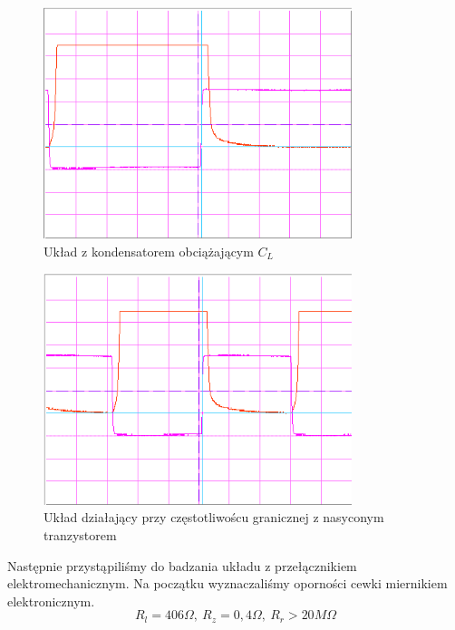 \documentclass[a4paper,11pt]{article}
\begin{document}
\begin{figure} [H]
  \begin{center}
    \includegraphics[width = 9cm]{../Obrazki_i_tekst/obrobione/II1zkon2ciety.png}
    \caption{ Układ z kondensatorem obciążającym $C_L$ }
  \end{center}
\end{figure}

\begin{figure} [H]
  \begin{center}
    \includegraphics[width = 9cm]{../Obrazki_i_tekst/obrobione/II1zfgranicznaciety.png}
    \caption{ Układ działający przy częstotliwoścu granicznej z nasyconym tranzystorem }
  \end{center}
\end{figure}


Następnie przystąpiliśmy do badzania układu z przełącznikiem elektromechanicznym. 
Na początku wyznaczaliśmy oporności cewki miernikiem elektronicznym. 
$$ R_l = 406 \Omega, \ R_z = 0,4 \Omega, \ R_r > 20 M\Omega $$ 
\end{document}
